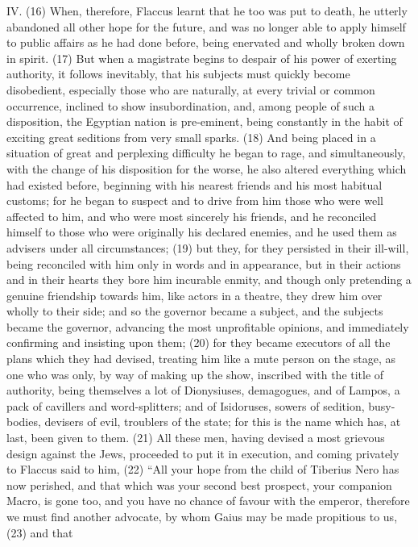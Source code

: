 IV. (16) When, therefore, Flaccus learnt that he too was put to death, he utterly abandoned all
other hope for the future, and was no longer able to apply himself to public affairs as he had done
before, being enervated and wholly broken down in spirit. (17) But when a magistrate begins to
despair of his power of exerting authority, it follows inevitably, that his subjects must quickly
become disobedient, especially those who are naturally, at every trivial or common occurrence,
inclined to show insubordination, and, among people of such a disposition, the Egyptian nation is
pre-eminent, being constantly in the habit of exciting great seditions from very small sparks. (18)
And being placed in a situation of great and perplexing difficulty he began to rage, and
simultaneously, with the change of his disposition for the worse, he also altered everything which
had existed before, beginning with his nearest friends and his most habitual customs; for he began
to suspect and to drive from him those who were well affected to him, and who were most sincerely
his friends, and he reconciled himself to those who were originally his declared enemies, and he
used them as advisers under all circumstances; (19) but they, for they persisted in their ill-will,
being reconciled with him only in words and in appearance, but in their actions and in their hearts
they bore him incurable enmity, and though only pretending a genuine friendship towards him, like
actors in a theatre, they drew him over wholly to their side; and so the governor became a subject,
and the subjects became the governor, advancing the most unprofitable opinions, and immediately
confirming and insisting upon them; (20) for they became executors of all the plans which they had
devised, treating him like a mute person on the stage, as one who was only, by way of making up
the show, inscribed with the title of authority, being themselves a lot of Dionysiuses, demagogues,
and of Lampos, a pack of cavillers and word-splitters; and of Isidoruses, sowers of sedition,
busy-bodies, devisers of evil, troublers of the state; for this is the name which has, at last, been
given to them. (21) All these men, having devised a most grievous design against the Jews,
proceeded to put it in execution, and coming privately to Flaccus said to him, (22) ``All your hope
from the child of Tiberius Nero has now perished, and that which was your second best prospect,
your companion Macro, is gone too, and you have no chance of favour with the emperor, therefore
we must find another advocate, by whom Gaius may be made propitious to us, (23) and that
